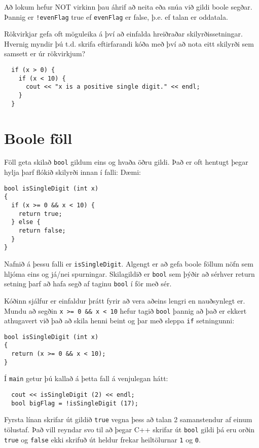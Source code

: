 Að lokum hefur NOT virkinn þau áhrif að neita eða snúa við gildi boole segðar.
Þannig er {\tt !evenFlag} true ef {\tt evenFlag} er false,  þ.e. ef talan er oddatala.


Rökvirkjar gefa oft möguleika á því að einfalda hreiðraðar skilyrðissetningar.
Hvernig myndir þú t.d. skrifa eftirfarandi kóða með því að nota eitt skilyrði sem samsett er úr rökvirkjum?

\begin{verbatim}
  if (x > 0) {
    if (x < 10) {
      cout << "x is a positive single digit." << endl;
    }
  }
\end{verbatim}

\section{Boole föll}
\label{bool}

Föll geta skilað {\tt bool} gildum eins og hvaða öðru gildi.
Það er oft hentugt þegar hylja þarf flókið skilyrði innan í falli:
Dæmi:

\begin{verbatim}
bool isSingleDigit (int x)
{
  if (x >= 0 && x < 10) {
    return true;
  } else {
    return false;
  }
}
\end{verbatim}
%
Nafnið á þessu falli er {\tt isSingleDigit}.
Algengt er að gefa boole föllum nöfn sem hljóma eins og já/nei spurningar.
Skilagildið er {\tt bool} sem þýðir að sérhver return setning þarf að hafa segð af taginu {\tt bool} í för með sér.

Kóðinn sjálfur er einfaldur þrátt fyrir að vera aðeins lengri en nauðsynlegt er.
Mundu að segðin {\tt x >= 0 \&\& x < 10} hefur tagið {\tt bool} þannig að það er ekkert athugavert við það að skila henni beint og þar með sleppa {\tt if} setningunni:

\begin{verbatim}
bool isSingleDigit (int x)
{
  return (x >= 0 && x < 10);
}
\end{verbatim}
%
Í {\tt main} getur þú kallað á þetta fall á venjulegan hátt:

\begin{verbatim}
  cout << isSingleDigit (2) << endl;
  bool bigFlag = !isSingleDigit (17);
\end{verbatim}
%
Fyrsta línan skrifar út gildið {\tt true} vegna þess að talan 2 samanstendur af einum tölustaf.
Það vill reyndar svo til að þegar C++ skrifar út {\tt bool} gildi þá eru orðin {\tt true} og {\tt false} ekki skrifuð út 
heldur frekar heiltölurnar {\tt 1} og {\tt 0}.

